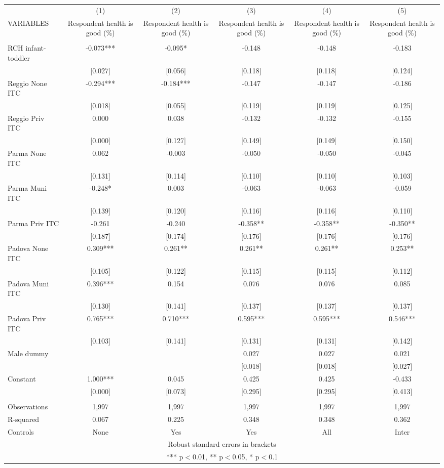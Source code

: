 \begin{tabular}{lccccc} \hline
 & (1) & (2) & (3) & (4) & (5) \\
VARIABLES & Respondent health is good (\%) & Respondent health is good (\%) & Respondent health is good (\%) & Respondent health is good (\%) & Respondent health is good (\%) \\ \hline
 &  &  &  &  &  \\
RCH infant-toddler & -0.073*** & -0.095* & -0.148 & -0.148 & -0.183 \\
 & [0.027] & [0.056] & [0.118] & [0.118] & [0.124] \\
Reggio None ITC & -0.294*** & -0.184*** & -0.147 & -0.147 & -0.186 \\
 & [0.018] & [0.055] & [0.119] & [0.119] & [0.125] \\
Reggio Priv ITC & 0.000 & 0.038 & -0.132 & -0.132 & -0.155 \\
 & [0.000] & [0.127] & [0.149] & [0.149] & [0.150] \\
Parma None ITC & 0.062 & -0.003 & -0.050 & -0.050 & -0.045 \\
 & [0.131] & [0.114] & [0.110] & [0.110] & [0.103] \\
Parma Muni ITC & -0.248* & 0.003 & -0.063 & -0.063 & -0.059 \\
 & [0.139] & [0.120] & [0.116] & [0.116] & [0.110] \\
Parma Priv ITC & -0.261 & -0.240 & -0.358** & -0.358** & -0.350** \\
 & [0.187] & [0.174] & [0.176] & [0.176] & [0.176] \\
Padova None ITC & 0.309*** & 0.261** & 0.261** & 0.261** & 0.253** \\
 & [0.105] & [0.122] & [0.115] & [0.115] & [0.112] \\
Padova Muni ITC & 0.396*** & 0.154 & 0.076 & 0.076 & 0.085 \\
 & [0.130] & [0.141] & [0.137] & [0.137] & [0.137] \\
Padova Priv ITC & 0.765*** & 0.710*** & 0.595*** & 0.595*** & 0.546*** \\
 & [0.103] & [0.141] & [0.131] & [0.131] & [0.142] \\
Male dummy &  &  & 0.027 & 0.027 & 0.021 \\
 &  &  & [0.018] & [0.018] & [0.027] \\
Constant & 1.000*** & 0.045 & 0.425 & 0.425 & -0.433 \\
 & [0.000] & [0.073] & [0.295] & [0.295] & [0.413] \\
 &  &  &  &  &  \\
Observations & 1,997 & 1,997 & 1,997 & 1,997 & 1,997 \\
R-squared & 0.067 & 0.225 & 0.348 & 0.348 & 0.362 \\
 Controls & None & Yes & Yes & All & Inter \\ \hline
\multicolumn{6}{c}{ Robust standard errors in brackets} \\
\multicolumn{6}{c}{ *** p$<$0.01, ** p$<$0.05, * p$<$0.1} \\
\end{tabular}
